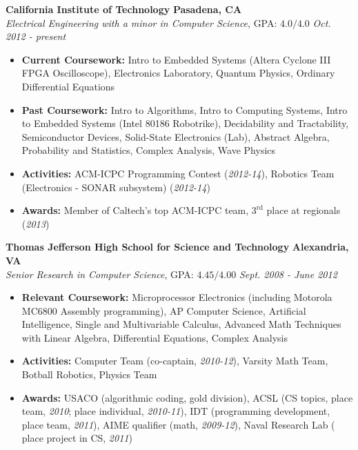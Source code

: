 \documentclass{article}
\newenvironment{changemargin}[2]{%
  \begin{list}{}{%
    \setlength{\topsep}{0pt}%
    \setlength{\leftmargin}{#1}%
    \setlength{\rightmargin}{#2}%
    \setlength{\listparindent}{\parindent}%
    \setlength{\itemindent}{\parindent}%
    \setlength{\parsep}{\parskip}%
  }%
  \item[]}{\end{list}
}
\newenvironment{body} {
	\vspace*{-16pt}
	\begin{changemargin}{-0.25in}{-0.5in}
  }	
	{\end{changemargin}
}
\begin{document}
\begin{body}
	\vspace{14pt}
	\textbf{California Institute of Technology} \hfill \textbf{Pasadena, CA}{} \\
	\emph{Electrical Engineering with a minor in Computer Science}, GPA: $4.0/4.0$ \hfill \emph{Oct. 2012 - present} \\
	\begin{itemize}
	\item \textbf{Current Coursework:} Intro to Embedded Systems (Altera Cyclone III FPGA Oscilloscope), Electronics Laboratory, Quantum Physics, Ordinary Differential Equations
	\item \textbf{Past Coursework:} Intro to Algorithms, Intro to Computing Systems, Intro to Embedded Systems (Intel 80186 Robotrike), Decidability and Tractability, Semiconductor Devices, Solid-State Electronics (Lab), Abstract Algebra, Probability and Statistics, Complex Analysis, Wave Physics
	\item \textbf{Activities:} ACM-ICPC Programming Contest (\textit{2012-14}), Robotics Team (Electronics - SONAR subsystem) (\textit{2012-14})
	\item \textbf{Awards:} Member of Caltech's top ACM-ICPC team, $3^\text{rd}$ place at regionals (\textit{2013})
	\end{itemize}

	\medskip

	\textbf{Thomas Jefferson High School for Science and Technology} \hfill \textbf{Alexandria, VA} \\
	\emph{Senior Research in Computer Science}, GPA: $4.45/4.00$ \hfill \emph{Sept. 2008 - June 2012} \\
	\begin{itemize}
	\item \textbf{Relevant Coursework:} Microprocessor Electronics (including Motorola MC6800 Assembly programming), AP Computer Science, Artificial Intelligence, Single and Multivariable Calculus, Advanced Math Techniques with Linear Algebra, Differential Equations, Complex Analysis
	\item \textbf{Activities:} Computer Team (co-captain, \textit{2010-12}), Varsity Math Team, Botball Robotics, Physics Team
	\item \textbf{Awards:} USACO (algorithmic coding, gold division), ACSL (CS topics,  place team, \textit{2010};  place individual, \textit{2010-11}), IDT (programming development,  place team, \textit{2011}), AIME qualifier (math, \textit{2009-12}), Naval Research Lab ( place project in CS, \textit{2011})
	\end{itemize}
\end{body}
\end{document}

